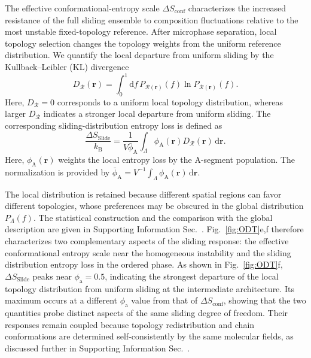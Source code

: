 The effective conformational-entropy scale $\Delta S_{\mathrm{conf}}$ characterizes the increased resistance of the full sliding ensemble to composition fluctuations relative to the most unstable fixed-topology reference.
After microphase separation, local topology selection changes the topology weights from the uniform reference distribution.
We quantify the local departure from uniform sliding by the Kullback--Leibler (KL) divergence
\begin{equation}
    D_{\mathcal R}(\bm r)
    =
    \int_0^1
    \mathrm df\,
    P_{\mathcal R(\bm r)}(f)
    \ln P_{\mathcal R(\bm r)}(f).
    \label{eq:LocalDivergence}
\end{equation}
Here, $D_{\mathcal R}=0$ corresponds to a uniform local topology distribution, whereas larger $D_{\mathcal R}$ indicates a stronger local departure from uniform sliding.
The corresponding sliding-distribution entropy loss is defined as
\begin{equation}
    \frac{\Delta S_{\mathrm{Slide}}}{k_{\mathrm B}}
    =
    \frac{1}{V\bar{\phi}_{\mathrm A}}
    \int_\Lambda 
    \phi_{\mathrm A}(\bm r) D_{\mathcal R}(\bm r) \, \mathrm d\bm r.
    \label{eq:SlideEntropy}
\end{equation}
Here, $\phi_{\mathrm A}(\bm r)$ weights the local entropy loss by the A-segment population.
The normalization is provided by $\bar{\phi}_{\mathrm A}=V^{-1}\int_\Lambda \phi_{\mathrm A}(\bm r)\,\mathrm d\bm r$.



The local distribution is retained because different spatial regions can favor different topologies, whose preferences may be obscured in the global distribution $P_\Lambda(f)$.
The statistical construction and the comparison with the global description are given in Supporting Information Sec.~.
Fig.~\ref{fig:ODT}e,f therefore characterizes two complementary aspects of the sliding response: the effective conformational entropy scale near the homogeneous instability and the sliding distribution entropy loss in the ordered phase.
As shown in Fig.~\ref{fig:ODT}f, $\Delta S_{\mathrm{Slide}}$ peaks near $\phi_{\mathrm a}=0.5$, indicating the strongest departure of the local topology distribution from uniform sliding at the intermediate architecture.
Its maximum occurs at a different $\phi_{\mathrm a}$ value from that of $\Delta S_{\mathrm{conf}}$, showing that the two quantities probe distinct aspects of the same sliding degree of freedom.
Their responses remain coupled because topology redistribution and chain conformations are determined self-consistently by the same molecular fields, as discussed further in Supporting Information Sec.~.

